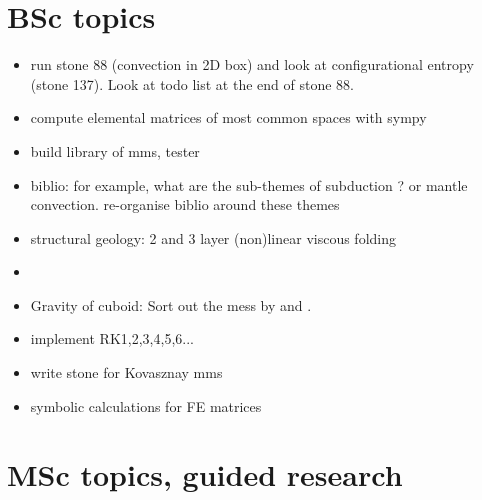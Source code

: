 \documentclass[a4paper]{article}
\begin{document}
\section{BSc topics}

\begin{itemize}
\item run stone 88 (convection in 2D box) and look at configurational entropy 
(stone 137). Look at todo list at the end of stone 88.
\item compute elemental matrices of most common spaces with sympy
\item build library of mms, tester
\item biblio: for example, what are the sub-themes of subduction ? 
or mantle convection. re-organise biblio around these themes
\item structural geology: 2 and 3 layer (non)linear viscous folding
\item {}
\item Gravity of cuboid: Sort out the mess by \textcite{duti16} and \textcite{zhhu17}.
\item implement RK1,2,3,4,5,6...
\item write stone for Kovasznay mms
\item symbolic calculations for FE matrices
\end{itemize}

\newpage
\section{MSc topics, guided research}
\end{document}
